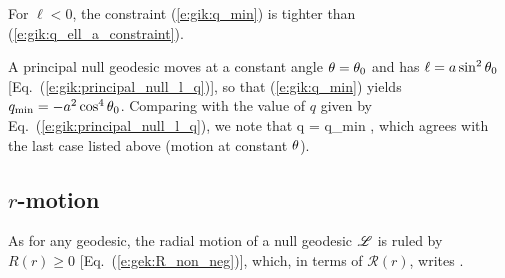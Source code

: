 \begin{remark}
For $\ell < 0$, the constraint (\ref{e:gik:q_min}) is tighter than
(\ref{e:gik:q_ell_a_constraint}).
\end{remark}

\begin{example}
A principal null geodesic moves at a constant angle
$\theta=\theta_0$ and has
$\ell = a\sin^2\theta_0$ [Eq.~(\ref{e:gik:principal_null_l_q})], so that
(\ref{e:gik:q_min}) yields $q_{\rm min} = - a^2 \cos^4\theta_0$.
Comparing with the value of $q$ given by Eq.~(\ref{e:gik:principal_null_l_q}),
we note that
\be
     q = q_{\rm min} ,
\ee
which agrees with the last case listed above (motion at constant
$\theta$).
\end{example}

\subsection{$r$-motion}

As for any geodesic, the radial motion of a null geodesic $\mathscr{L}$ is ruled by
$R(r)\geq 0$ [Eq.~(\ref{e:gek:R_non_neg})], which, in terms of $\mathcal{R}(r)$,
writes
\be \label{e:mcR_non_neg}
    .
\ee

